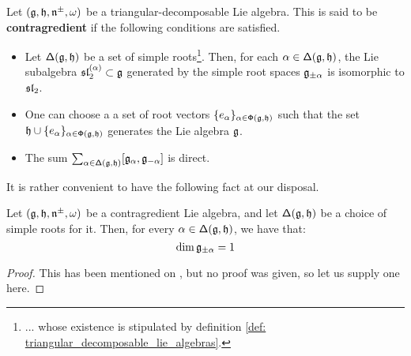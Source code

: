         \begin{definition} \label{def: contragredient_lie_algebras}
            Let $(\g, \h, \n^{\pm}, \omega)$ be a triangular-decomposable Lie algebra. This is said to be \textbf{contragredient} if the following conditions are satisfied.
            \begin{itemize}
                \item Let $\simpleroots(\g, \h)$ be a set of simple roots\footnote{... whose existence is stipulated by definition \ref{def: triangular_decomposable_lie_algebras}.}. Then, for each $\alpha \in \simpleroots(\g, \h)$, the Lie subalgebra $\sl_2^{(\alpha)} \subset \g$ generated by the simple root spaces $\g_{\pm \alpha}$ is isomorphic to $\sl_2$.
                \item One can choose a a set of root vectors $\{ e_{\alpha} \}_{\alpha \in \rootsystem(\g, \h)}$ such that the set $\h \cup \{ e_{\alpha} \}_{\alpha \in \rootsystem(\g, \h)}$ generates the Lie algebra $\g$.
                \item The sum $\sum_{\alpha \in \simpleroots(\g, \h)} [\g_{\alpha}, \g_{-\alpha}]$ is direct.
            \end{itemize}
        \end{definition}
        It is rather convenient to have the following fact at our disposal.
        \begin{lemma} \label{lemma: simple_root_spaces_are_1_dimensional}
            Let $(\g, \h, \n^{\pm}, \omega)$ be a contragredient Lie algebra, and let $\simpleroots(\g, \h)$ be a choice of simple roots for it. Then, for every $\alpha \in \simpleroots(\g, \h)$, we have that:
                $$\dim \g_{\pm \alpha} = 1$$
        \end{lemma}
            \begin{proof}
                This has been mentioned on \cite[Section 4.1, p. 311]{moody_pianzola_lie_algebras_with_triangular_decompositions}, but no proof was given, so let us supply one here.
            \end{proof}
